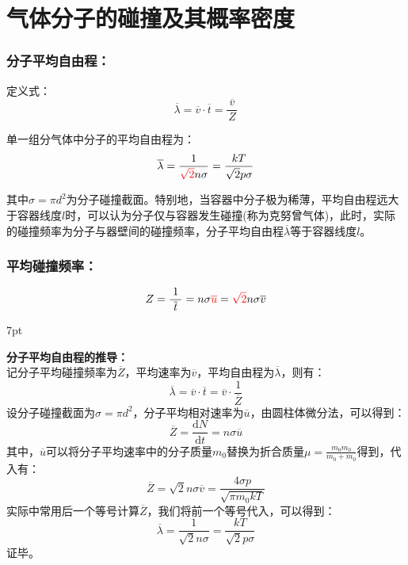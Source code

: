 \documentclass[zihao=5,UTF8]{report}
\newenvironment{graybox}{%
\def\FrameCommand{%
\hspace{1pt}%
{\color{gray}\small \vrule width 2pt}%
{\color{graybox_color}\vrule width 4pt}%
\colorbox{graybox_color}%
}%
\MakeFramed{\advance\hsize-\width\FrameRestore}%
\noindent\hspace{-4.55pt}%
\begin{adjustwidth}{}{7pt}%
\vspace{2pt}\vspace{2pt}%
}
{%
\vspace{2pt}\end{adjustwidth}\endMakeFramed%
}
\begin{document}
\section{气体分子的碰撞及其概率密度}

\subsubsection{分子平均自由程：}
定义式：
\begin{equation}
    \overline{\lambda} = \overline{v}\cdot \overline{t} = \frac{\ \overline{v}\ }{Z}
\end{equation}\par
单一组分气体中分子的平均自由程为：
\begin{equation}
    \overline{\lambda} = \frac{1}{\textcolor{red}{\sqrt{2}}n \sigma } = \frac{kT}{\sqrt{2}p\sigma}
\end{equation}\par
{\color{gray}\small 其中$\sigma = \pi d^2$为分子碰撞截面。特别地，当容器中分子极为稀薄，平均自由程远大于容器线度$l$时，可以认为分子仅与容器发生碰撞(称为克努曾气体)，此时，实际的碰撞频率为分子与器壁间的碰撞频率，分子平均自由程$\overline{\lambda}$等于容器线度$l$。}
\subsubsection{平均碰撞频率：}
\begin{equation}
    Z = \frac{1}{\ \overline{t}\ } =  n\sigma \textcolor{red}{\overline{u}} = \textcolor{red}{\sqrt{2}}n\sigma \overline{v}
\end{equation}
\par

\begin{graybox}
    \textbf{分子平均自由程的推导：}\\
    记分子平均碰撞频率为$\overline{Z}$，平均速率为$\overline{v}$，平均自由程为$\overline{\lambda}$，则有：
\begin{equation}
    \overline{\lambda} =\overline{v}\cdot \overline{t} =\overline{v}\cdot \frac{1}{\overline{Z}}
\end{equation}
设分子碰撞截面为$\sigma = \pi d^2$，分子平均相对速率为$\overline{u}$，由圆柱体微分法，可以得到：
\begin{equation}
    \overline{Z} = \frac{\mathrm{d}N}{\mathrm{d}t} = n\sigma \overline{u}
\end{equation}
其中，$\overline{u}$可以将分子平均速率中的分子质量$m_0$替换为折合质量$\mu = \frac{m_0m_0}{m_0+m_0}$得到，代入有：
\begin{equation}
    \overline{Z} = \sqrt{2}n\sigma\overline{v}  = \frac{4\sigma p}{\sqrt{\pi m_0kT}}
\end{equation}
实际中常用后一个等号计算$\overline{Z}$，我们将前一个等号代入，可以得到：
\begin{equation}
    \overline{\lambda} = \frac{1}{\sqrt{2}n\sigma}= \frac{kT}{\sqrt{2}p\sigma}
\end{equation}
证毕。
\end{graybox}
\end{document}
